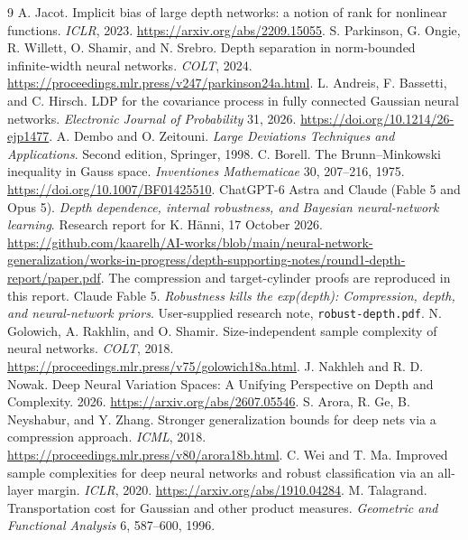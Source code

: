 \documentclass[11pt]{article}
\begin{document}
\begin{thebibliography}{9}
 A. Jacot.
Implicit bias of large depth networks: a notion of rank for nonlinear functions.
\emph{ICLR}, 2023. \url{https://arxiv.org/abs/2209.15055}.
 S. Parkinson, G. Ongie, R. Willett, O. Shamir,
and N. Srebro. Depth separation in norm-bounded infinite-width neural networks.
\emph{COLT}, 2024. \url{https://proceedings.mlr.press/v247/parkinson24a.html}.
 L. Andreis, F. Bassetti, and C. Hirsch.
LDP for the covariance process in fully connected Gaussian neural networks.
\emph{Electronic Journal of Probability} 31, 2026.
\url{https://doi.org/10.1214/26-ejp1477}.
 A. Dembo and O. Zeitouni.
\emph{Large Deviations Techniques and Applications}. Second edition,
Springer, 1998.
 C. Borell.
The Brunn--Minkowski inequality in Gauss space.
\emph{Inventiones Mathematicae} 30, 207--216, 1975.
\url{https://doi.org/10.1007/BF01425510}.
 ChatGPT-6 Astra and Claude (Fable 5 and Opus 5). \emph{Depth dependence, internal robustness,
and Bayesian neural-network learning}. Research report for K. H\"anni,
17 October 2026.
\url{https://github.com/kaarelh/AI-works/blob/main/neural-network-generalization/works-in-progress/depth-supporting-notes/round1-depth-report/paper.pdf}.
The compression and target-cylinder proofs are reproduced in this report.
 Claude Fable 5. \emph{Robustness kills the exp(depth):
Compression, depth, and neural-network priors}. User-supplied research note,
\texttt{robust-depth.pdf}.
 N. Golowich, A. Rakhlin, and O. Shamir.
Size-independent sample complexity of neural networks.
\emph{COLT}, 2018. \url{https://proceedings.mlr.press/v75/golowich18a.html}.
 J. Nakhleh and R. D. Nowak.
Deep Neural Variation Spaces: A Unifying Perspective on Depth and Complexity.
2026. \url{https://arxiv.org/abs/2607.05546}.
 S. Arora, R. Ge, B. Neyshabur, and Y. Zhang.
Stronger generalization bounds for deep nets via a compression approach.
\emph{ICML}, 2018. \url{https://proceedings.mlr.press/v80/arora18b.html}.
 C. Wei and T. Ma.
Improved sample complexities for deep neural networks and robust classification
via an all-layer margin. \emph{ICLR}, 2020.
\url{https://arxiv.org/abs/1910.04284}.
 M. Talagrand.
Transportation cost for Gaussian and other product measures.
\emph{Geometric and Functional Analysis} 6, 587--600, 1996.
\end{thebibliography}
\end{document}
